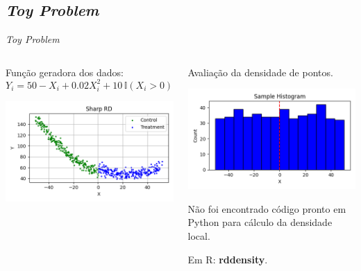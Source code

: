 \documentclass[aspectratio=1610, 10pt]{beamer}
\begin{document}
\subsection{\emph{Toy Problem}}
\begin{frame}{\emph{Toy Problem}}
    \begin{columns}[T] %
		\begin{column}{0.48\linewidth} %
            Função geradora dos dados:
            \begin{equation*}
                Y_i = 50 - X_i + 0.02 X_i^2 + 10 \, \mathbb{I}(X_i > 0) + \mathcal{N}(0,5)
            \end{equation*}

            \includegraphics[width=\linewidth]{toy/SharpRD.png}
		\end{column}
		\begin{column}{0.48\linewidth}
            Avaliação da densidade de pontos.

            \includegraphics[width=\linewidth]{toy/SampleHistogram.png}

            Não foi encontrado código pronto em Python para cálculo da densidade local.

            Em R: \textbf{rddensity}.
        \end{column}
	\end{columns}
\end{frame}
\end{document}
